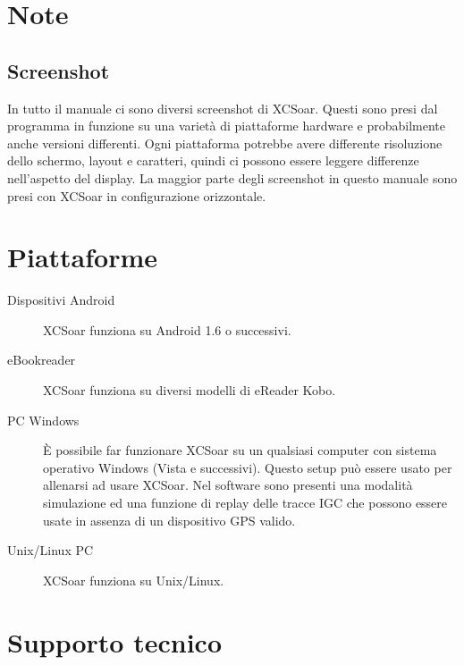 \section{Note}

\subsection*{Screenshot}
In tutto il manuale ci sono diversi screenshot di XCSoar. Questi sono presi
dal programma in funzione su una varietà di piattaforme hardware e probabilmente
anche versioni differenti. Ogni piattaforma potrebbe avere differente risoluzione
dello schermo, layout e caratteri, quindi ci possono essere leggere differenze 
nell'aspetto del display. La maggior parte degli screenshot in questo manuale
sono presi con XCSoar in configurazione orizzontale.

\section{Piattaforme}
\begin{description}
\item[Dispositivi Android]
XCSoar funziona su Android 1.6 o successivi.
\item [eBookreader]
XCSoar funziona su diversi modelli di eReader Kobo.
\item[PC Windows]
È possibile far funzionare XCSoar su un qualsiasi computer con sistema
operativo Windows (Vista e successivi). 
Questo setup può essere usato per allenarsi ad usare XCSoar.
Nel software sono presenti una modalità simulazione ed una funzione
di replay delle tracce IGC che possono essere usate in assenza di un
dispositivo GPS valido.
\item[Unix/Linux PC]
XCSoar funziona su Unix/Linux.
\end{description}



\section{Supporto tecnico}

